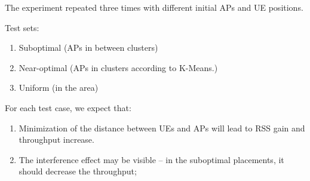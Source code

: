 The experiment repeated three times with different initial APs and UE
positions.

Test sets:

\begin{enumerate}
\def\labelenumi{\arabic{enumi}.}
\tightlist
\item
  Suboptimal (APs in between clusters)
\item
  Near-optimal (APs in clusters according to K-Means.)
\item
  Uniform (in the area)
\end{enumerate}

For each test case, we expect that:

\begin{enumerate}
\def\labelenumi{\arabic{enumi}.}
\tightlist
\item
  Minimization of the distance between UEs and APs will lead to RSS gain
  and throughput increase.
\item
  The interference effect may be visible -- in the suboptimal
  placements, it should decrease the throughput;
\end{enumerate}